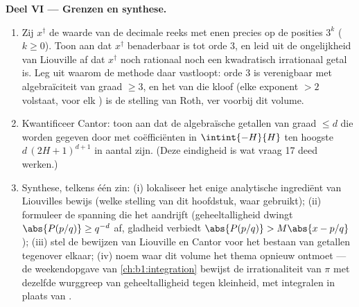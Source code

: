 \begin{problem}
\medskip
\noindent\textbf{Deel VI --- Grenzen en synthese.}
\begin{enumerate}[resume]
  \item Zij $x^\dagger$ de waarde van de decimale reeks met enen
        precies op de posities $3^k$ ($k \geq 0$). Toon aan dat
        $x^\dagger$ benaderbaar is tot orde $3$, en leid uit de
        ongelijkheid van Liouville af dat $x^\dagger$ noch
        rationaal noch een kwadratisch irrationaal getal is. Leg
        uit waarom de methode daar vastloopt: orde $3$ is
        verenigbaar met algebraïciteit van graad $\geq 3$, en het
         van die kloof (elke exponent $> 2$ volstaat, voor
        elk ) is de stelling van Roth, ver
        voorbij dit volume.
  \item Kwantificeer Cantor: toon aan dat de algebraïsche getallen
        van graad $\leq d$ die worden gegeven door  met
        coëfficiënten in $\intint{-H}{H}$ ten hoogste $d\,(2H +
        1)^{d+1}$ in aantal zijn. (Deze eindigheid is wat vraag 17
        deed werken.)
  \item Synthese, telkens één zin: (i) lokaliseer het enige
        analytische ingrediënt van Liouvilles bewijs (welke
        stelling van dit hoofdstuk, waar gebruikt); (ii) formuleer
        de spanning die het aandrijft (geheeltalligheid dwingt
        $\abs{P(p/q)} \geq q^{-d}$ af, gladheid verbiedt
        $\abs{P(p/q)} > M\abs{x - p/q}$); (iii) stel de bewijzen
        van Liouville en Cantor voor het bestaan van 
        getallen tegenover elkaar; (iv) noem waar dit volume het
        thema opnieuw ontmoet --- de weekendopgave van
        \cref{ch:b1:integration} bewijst de irrationaliteit van
        $\pi$ met dezelfde wurggreep van geheeltalligheid tegen
        kleinheid, met integralen in plaats van .
\end{enumerate}
\end{problem}
